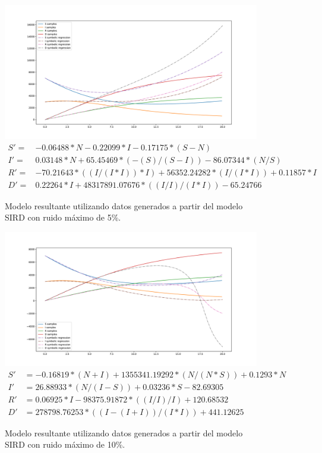 \begin{figure}[h]
    \centering
    \includegraphics[width=\textwidth]{"figures/final_plot_SIRD_0.05.pdf"}
    \begin{align*}
        S' = & -0.06488 * N -0.22099 * I -0.17175 * (S - N)                                \\
        I' = & 0.03148 * N + 65.45469 * (-(S) / (S - I)) -86.07344 * (N / S)               \\
        R' = & -70.21643 * ((I / (I * I)) * I) + 56352.24282 * (I / (I * I)) + 0.11857 * I \\
        D' = & 0.22264 * I + 48317891.07676 * ((I / I) / (I * I)) -65.24766
    \end{align*}
    \caption{Modelo resultante utilizando datos generados a partir del modelo SIRD con ruido máximo de 5\%.}
    \label{fig:final_plot_SIRD_0.05}
\end{figure}

\begin{figure}[h]
    \centering
    \includegraphics[width=\textwidth]{"figures/final_plot_SIRD_0.1.pdf"}
    \begin{align*}
        S' & = -0.16819 * (N + I) + 1355341.19292 * (N / (N * S)) + 0.1293 * N \\
        I' & = 26.88933 * (N / (I - S)) + 0.03236 * S -82.69305                \\
        R' & = 0.06925 * I -98375.91872 * ((I / I) / I) + 120.68532            \\
        D' & =278798.76253 * ((I - (I + I)) / (I * I)) + 441.12625
    \end{align*}
    \caption{Modelo resultante utilizando datos generados a partir del modelo SIRD con ruido máximo de 10\%.}
    \label{fig:final_plot_SIRD_0.1}
\end{figure}

